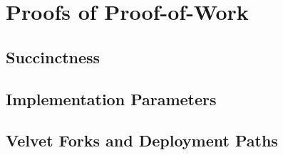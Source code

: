 \chapter{Proofs of Proof-of-Work}\label{chapter:work}


















\section{Succinctness}
\section{Implementation Parameters}
\section{Velvet Forks and Deployment Paths}
